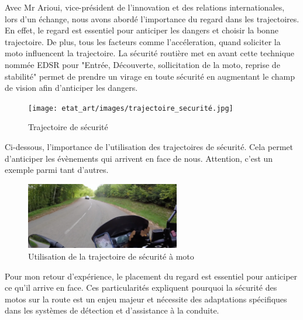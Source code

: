 Avec Mr Arioui, vice-président de l'innovation et des relations internationales, lors d'un échange, nous avons abordé l'importance du regard dans les trajectoires. En effet, le regard est essentiel pour anticiper les dangers et choisir la bonne trajectoire. De plus, tous les facteurs comme l'accéleration, quand soliciter la moto influencent la trajectoire. 
La sécurité routière\cite{trajectoire_securite} met en avant cette technique nommée EDSR pour "Entrée, Découverte, sollicitation de la moto, reprise de stabilité" permet de prendre un virage en toute sécurité en augmentant le champ de vision afin d'anticiper les dangers. 
\begin{figure}[H]
    \centering
    \texttt{[image: etat\_art/images/trajectoire\_securité.jpg]} 
    \caption{Trajectoire de sécurité}
\end{figure}
Ci-dessous, l'importance de l'utilisation des trajectoires de sécurité. Cela permet d'anticiper les évènements qui arrivent en face de nous. Attention, c'est un exemple parmi tant d'autres.
\begin{figure}[H]
    \centering
    \includegraphics[width=0.6\textwidth]{etat_art/images/morvan.png} 
    \caption{Utilisation de la trajectoire de sécurité à moto}
\end{figure}
Pour mon retour d'expérience, le placement du regard est essentiel pour anticiper ce qu'il arrive en face. 
\vspace{0.5cm} %
Ces particularités expliquent pourquoi la sécurité des motos sur la route est un enjeu majeur et nécessite des adaptations spécifiques dans les systèmes de détection et d’assistance à la conduite. 


